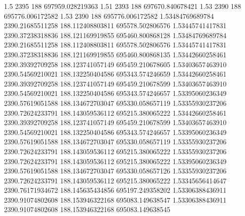 1.5					2395				188					697959.028219363
1.51				2393				188					697670.840678421
1.53				2390				188					695776.006172582
1.53				2390				188					695776.006172582
1.53484769689784	2390.21685511258	188.112408803811	695578.502806576
1.53445741417831	2390.37238318836	188.121169919855	695460.800868128
1.53484769689784	2390.21685511258	188.112408803811	695578.502806576
1.53445741417831	2390.37238318836	188.121169919855	695460.800868135
1.53442660258461	2390.39392709258	188.123741057149	695459.210678605
1.53403657463910	2390.54569210021	188.132250404586	695343.574246659
1.53442660258461	2390.39392709258	188.123741057149	695459.210678599
1.53403657463910	2390.54569210021	188.132250404586	695343.574246657
1.53395060236349	2390.57619051588	188.134672703047	695330.058657119
1.53355930237206	2390.72624233791	188.143059536112	695215.380065222
1.53442660258461	2390.39392709258	188.123741057149	695459.210678599
1.53403657463910	2390.54569210021	188.132250404586	695343.574246657
1.53395060236349	2390.57619051588	188.134672703047	695330.058657119
1.53355930237206	2390.72624233791	188.143059536112	695215.380065222
1.53355930237206	2390.72624233791	188.143059536112	695215.380065222
1.53395060236349	2390.57619051588	188.134672703047	695330.058657126
1.53355930237206	2390.72624233791	188.143059536112	695215.380065222
1.53345656414647	2390.76171934672	188.145635434856	695197.249358202
1.53306388436911	2390.91074802608	188.153946322168	695083.149638547
1.53306388436911	2390.91074802608	188.153946322168	695083.149638545